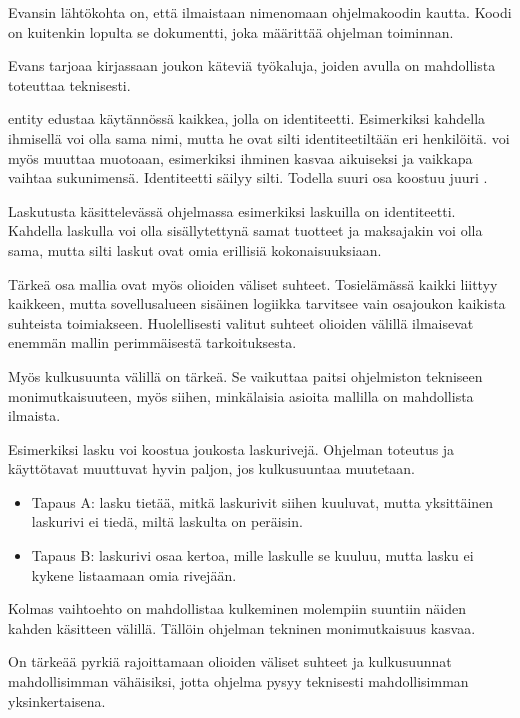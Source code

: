 Evansin lähtökohta on, että  ilmaistaan
nimenomaan ohjelmakoodin kautta. Koodi on kuitenkin lopulta se
dokumentti, joka määrittää ohjelman toiminnan.

Evans tarjoaa kirjassaan joukon käteviä työkaluja, joiden avulla
 on mahdollista toteuttaa teknisesti.

\Gls{entity} edustaa käytännössä kaikkea, jolla on identiteetti.
Esimerkiksi kahdella ihmisellä voi olla sama nimi, mutta he ovat silti
identiteetiltään eri henkilöitä.  voi myös muuttaa
muotoaan, esimerkiksi ihminen kasvaa aikuiseksi ja vaikkapa vaihtaa
sukunimensä. Identiteetti säilyy silti. Todella suuri osa
 koostuu juuri
.

Laskutusta käsittelevässä ohjelmassa esimerkiksi laskuilla on
identiteetti. Kahdella laskulla voi olla sisällytettynä samat tuotteet
ja maksajakin voi olla sama, mutta silti laskut ovat omia erillisiä
kokonaisuuksiaan.

Tärkeä osa mallia ovat myös olioiden väliset suhteet. Tosielämässä
kaikki liittyy kaikkeen, mutta sovellusalueen sisäinen logiikka
tarvitsee vain osajoukon kaikista suhteista toimiakseen. Huolellisesti
valitut suhteet olioiden välillä ilmaisevat enemmän mallin perimmäisestä
tarkoituksesta.

Myös \gls{kulkusuunta}  välillä on
tärkeä. Se vaikuttaa paitsi ohjelmiston tekniseen monimutkaisuuteen,
myös siihen, minkälaisia asioita mallilla on mahdollista ilmaista.

Esimerkiksi lasku voi koostua joukosta laskurivejä. Ohjelman toteutus ja
käyttötavat muuttuvat hyvin paljon, jos kulkusuuntaa muutetaan.

\begin{itemize}
\tightlist
\item
  Tapaus A: lasku tietää, mitkä laskurivit siihen kuuluvat, mutta
  yksittäinen laskurivi ei tiedä, miltä laskulta on peräisin.
\item
  Tapaus B: laskurivi osaa kertoa, mille laskulle se kuuluu, mutta lasku
  ei kykene listaamaan omia rivejään.
\end{itemize}

Kolmas vaihtoehto on mahdollistaa kulkeminen molempiin suuntiin näiden
kahden käsitteen välillä. Tällöin ohjelman tekninen monimutkaisuus
kasvaa.

On tärkeää pyrkiä rajoittamaan olioiden väliset suhteet ja kulkusuunnat
mahdollisimman vähäisiksi, jotta ohjelma pysyy teknisesti mahdollisimman
yksinkertaisena.

